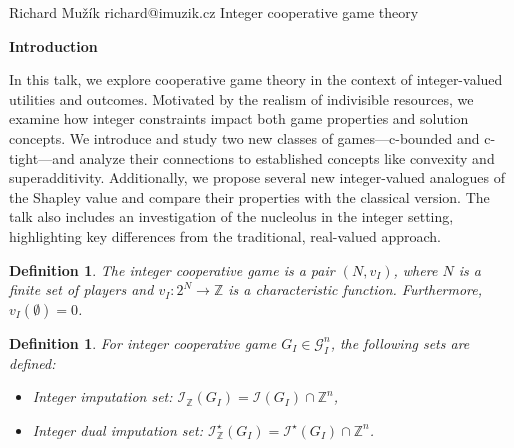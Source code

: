 \documentclass[12pt]{report}
\newcommand{\Talk}[4]{%
  \Id\FirstName #1 \Surname #2 \Email #3
  \Serie
  \Title #4
  \PaperAuthor
  \Link
  \Text\End
}
\newcommand{\PaperTalk}[6]{%
  \Id\FirstName #1 \Surname #2 \Email #3
  \Serie
  \Title #5
  \PaperAuthor #4
  \Link #6
  \Text\End
}
\newcommand{\SeriesTalk}[7]{%
  \Id\FirstName #1 \Surname #2 \Email #3
  \Serie #6
  \Title #5
  \PaperAuthor #4
  \Link #7
  \Text\End
}
\newcommand{\SeriesOther}[5]{%
  \Id\FirstName #1 \Surname #2 \Email #3
  \Serie #5
  \Title #4
  \PaperAuthor
  \Link
  \Text\End
}
\newcounter{theorem}
\newtheorem{definition}[theorem]{Definition}
\def\section#1{\vskip 9pt plus 2pt minus 1pt\centerline{\bf #1}\par\ignorespaces}
\begin{document}
\Talk{Richard}{Mužík}{richard@imuzik.cz}{Integer cooperative game theory}
\section{Introduction}
In this talk, we explore cooperative game theory in the context of integer-valued utilities and outcomes.
Motivated by the realism of indivisible resources, we examine how integer constraints impact both game properties and solution concepts.
We introduce and study two new classes of games—c-bounded and c-tight—and analyze their connections to established concepts like convexity and superadditivity.
Additionally, we propose several new integer-valued analogues of the Shapley value and compare their properties with the classical version.
The talk also includes an investigation of the nucleolus in the integer setting, highlighting key differences from the traditional, real-valued approach.

\begin{definition}
    The \emph{integer cooperative game} is a pair $(N, v_I)$, where $N$ is a finite set of players and $v_I: 2^N \to \mathbb{Z}$ is a characteristic function.
    Furthermore, $v_I(\emptyset) = 0$.
\end{definition}

\begin{definition}
    For integer cooperative game $G_I \in \mathcal{G}_I^n$, the following sets are defined:
    \begin{itemize}
        \item \emph{Integer imputation set}: $\mathcal{I}_{\mathbb{Z}}(G_I) = \mathcal{I}(G_I) \cap \mathbb{Z}^{n}$,
        \item \emph{Integer dual imputation set}: $\mathcal{I}_{\mathbb{Z}}^{\star}(G_I) = \mathcal{I}^{\star}(G_I) \cap \mathbb{Z}^{n}$.
    \end{itemize}
\end{definition}
\end{document}
